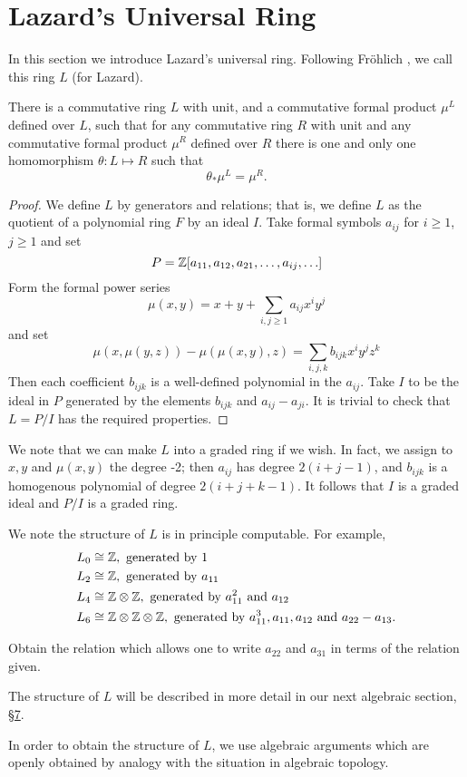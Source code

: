 \documentclass[../main]{subfiles}
\begin{document}
\label{sec:p2c5}

\chapter{Lazard's Universal Ring}

In this section we introduce Lazard's universal ring. Following Fr\"{o}hlich \cite{frolich}, we call this ring $L$ (for Lazard).

\begin{theorem}
\label{thm:p2c05.1}
There is a commutative ring $L$ with unit, and a commutative formal product $\mu^L$ defined over $L$, such that for any commutative ring $R$ with unit and any commutative formal product $\mu^R$ defined over $R$ there is one and only one homomorphism $\theta:L\mapsto R$ such that $$\theta_\ast\mu^L = \mu^R.$$
\end{theorem}
\begin{proof}
We define $L$ by generators and relations; that is, we define $L$ as the quotient of a polynomial ring $F$ by an ideal $I$. Take formal symbols $a_{ij}$ for $i\ge 1$, $j\ge 1$ and set $$P = \mathbb{Z} [a_{11}, a_{12}, a_{21}, \ldots, a_{ij}, \ldots]$$
Form the formal power series \begin{equation}
\label{eqn:p2c05.2}
\tag{5.2}
\mu(x,y) = x+y+\sum_{i,j\ge 1} a_{ij} x^i y^j
\end{equation}
and set 
\begin{equation}
\label{eqn:p2c05.3}
\tag{5.3}
\mu(x, \mu(y,z)) - \mu(\mu(x,y),z) = \sum_{i,j,k} b_{ijk} x^i y^j z^k
\end{equation}
Then each coefficient $b_{ijk}$ is a well-defined polynomial in the $a_{ij}$. Take $I$ to be the ideal in $P$ generated by the elements $b_{ijk}$ and $a_{ij} - a_{ji}$. It is trivial to check that $L=P/I$ has the required properties. 
\end{proof}
We note that we can make $L$ into a graded ring if we wish. In fact, we assign to $x,y$ and $\mu(x,y)$ the degree -2; then $a_{ij}$ has degree $2(i+j-1)$, and $b_{ijk}$ is a homogenous polynomial of degree $2(i+j+k-1)$. It follows that $I$ is a graded ideal and $P/I$ is a graded ring.

We note the structure of $L$ is in principle computable. For example, 
\begin{align*}
L_0 &\cong \mathbb{Z},\text{ generated by }1\\
L_2 &\cong \mathbb{Z},\text{ generated by }a_{11}\\
L_4 &\cong \mathbb{Z}\otimes\mathbb{Z},\text{ generated by }a^2_{11}\text{ and }a_{12}\\
L_6 &\cong \mathbb{Z}\otimes\mathbb{Z}\otimes\mathbb{Z},\text{ generated by }a^3_{11}, a_{11}, a_{12}\text{ and }a_{22}-a_{13}.
\end{align*}
\begin{exercise}
Obtain the relation which allows one to write $a_{22}$ and $a_{31}$ in terms of the relation given.
\end{exercise}
The structure of $L$ will be described in more detail in our next algebraic section, \hyperref[sec:p2c7]{\S 7}. 

In order to obtain the structure of $L$, we use algebraic arguments which are openly obtained by analogy with the situation in algebraic topology. 
\end{document}
